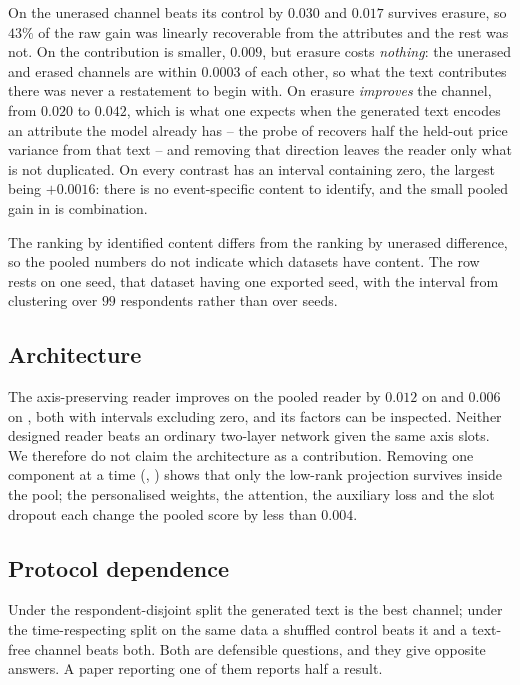 On  the unerased channel beats its control by $0.030$ and $0.017$ survives
erasure, so $43\%$ of the raw gain was linearly recoverable from the attributes and the rest
was not. On  the contribution is smaller, $0.009$, but erasure costs
\emph{nothing}: the unerased and erased channels are within $0.0003$ of each other, so what the
text contributes there was never a restatement to begin with. On  erasure
\emph{improves} the channel, from $0.020$ to $0.042$, which is what one expects when the
generated text encodes an attribute the model already has -- the probe of
 recovers half the held-out price variance from that text -- and
removing that direction leaves the reader only what is not duplicated. On 
every contrast has an interval containing zero, the largest being $+0.0016$: there is no
event-specific content to identify, and the small pooled gain in  is
combination.

The ranking by identified content differs from the ranking by unerased difference, so the
pooled numbers do not indicate which datasets have content. The  row rests on
one seed, that dataset having one exported seed, with the interval from clustering over $99$
respondents rather than over seeds.

\subsection{Architecture}

The axis-preserving reader improves on the pooled reader by $0.012$ on  and
$0.006$ on , both with intervals excluding zero, and its factors can be
inspected. Neither designed reader beats an ordinary two-layer network given the same axis
slots. We therefore do not claim the architecture as a contribution. Removing one component at a time
(, ) shows that only the low-rank projection survives inside
the pool; the personalised weights, the attention, the auxiliary loss and the slot dropout each
change the pooled score by less than $0.004$.

\subsection{Protocol dependence}

Under the respondent-disjoint split the generated text is the best channel; under the
time-respecting split on the same data a shuffled control beats it and a text-free channel
beats both. Both are defensible questions, and they give opposite answers. A paper reporting
one of them reports half a result.
